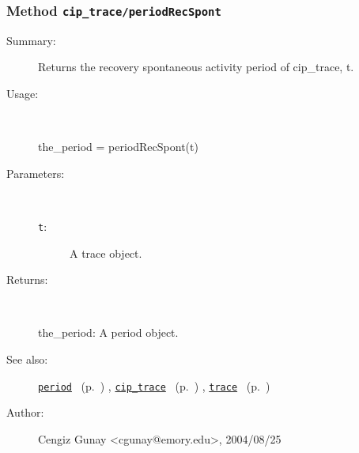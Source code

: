 \subsubsection[Method \texttt{periodRecSpont}]{Method \texttt{cip\_trace/periodRecSpont}}%
%
\label{ref_cip_trace__periodRecSpont}%
\hypertarget{ref_cip_trace__periodRecSpont}{}%
\begin{description}
\item[Summary:]Returns the recovery spontaneous activity period 
		of cip\_trace, t. 
%
\item[Usage:]~%
\begin{lyxcode}%
the\_period = periodRecSpont(t)
%
\end{lyxcode}%
%
%
\item[Parameters:]~
\begin{description}%
\item[\texttt{t}:]
 A trace object.
\end{description}%
%
\item[Returns:]~

	the\_period: A period object.
%
%
\item[See also:]%
\hyperlink{ref_period}{\texttt{period}}%
\ (p.~\pageref{ref_period})%
%
, \hyperlink{ref_cip_trace}{\texttt{cip\_trace}}%
\ (p.~\pageref{ref_cip_trace})%
%
, \hyperlink{ref_trace}{\texttt{trace}}%
\ (p.~\pageref{ref_trace})%
%
%
\item[Author:]%
Cengiz Gunay <cgunay@emory.edu>, 2004/08/25%
\end{description}
\methodline%
